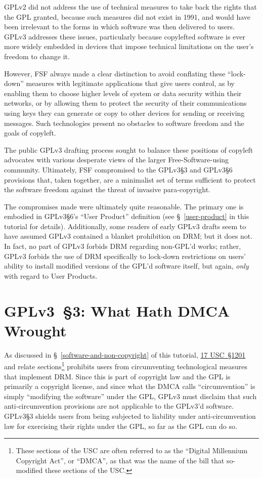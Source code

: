 GPLv2 did not address the use of technical measures to take back the rights
that the GPL granted, because such measures did not exist in 1991, and would
have been irrelevant to the forms in which software was then delivered to
users.  GPLv3 addresses these issues, particularly because copylefted
software is ever more widely embedded in devices that impose technical
limitations on the user's freedom to change it.

However, FSF always made a clear distinction to avoid conflating these
``lock-down'' measures with legitimate applications that give users control,
as by enabling them to choose higher levels of system or data security within
their networks, or by allowing them to protect the security of their
communications using keys they can generate or copy to other devices for
sending or receiving messages.  Such technologies present no obstacles to
software freedom and the goals of copyleft.

The public GPLv3 drafting process sought to balance these positions of
copyleft advocates with various desperate views of the larger
Free-Software-using community.  Ultimately, FSF compromised to the GPLv3\S3
and GPLv3\S6 provisions that, taken together, are a minimalist set of terms
sufficient to protect the software freedom against the threat of invasive
para-copyright.

The compromises made were ultimately quite reasonable.  The primary one is
embodied in GPLv3\S6's ``User Product'' definition (see \S~\ref{user-product}
in this tutorial for details).  Additionally, some readers of early GPLv3
drafts seem to have assumed GPLv3 contained a blanket prohibition on DRM; but
it does not.  In fact, no part of GPLv3 forbids DRM regarding non-GPL'd
works; rather, GPLv3 forbids the use of DRM specifically to lock-down
restrictions on users' ability to install modified versions of the GPL'd
software itself, but again, \textit{only} with regard to User Products.

\section{GPLv3~\S3: What Hath DMCA Wrought}
\label{GPLv3s3}

As discussed in \S~\ref{software-and-non-copyright} of this tutorial,
\href{http://www.law.cornell.edu/uscode/text/17/1201}{17 USC~\S1201} and
relate sections\footnote{These sections of the USC are often referred to as
  the ``Digital Millennium Copyright Act'', or ``DMCA'', as that was the name
  of the bill that so-modified these sections of the USC\@.} prohibits users
from circumventing technological measures that implement DRM\@.  Since this
is part of copyright law and the GPL is primarily a copyright license, and
since what the DMCA calls ``circumvention'' is simply ``modifying the
software'' under the GPL, GPLv3 must disclaim that such anti-circumvention
provisions are not applicable to the GPLv3'd software.  GPLv3\S3 shields
users from being subjected to liability under anti-circumvention law for
exercising their rights under the GPL, so far as the GPL can do so.

